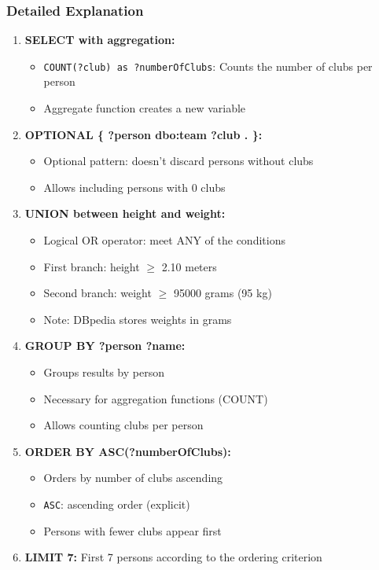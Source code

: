\documentclass[12pt,a4paper]{article}
\begin{document}
\subsubsection{Detailed Explanation}

\begin{enumerate}
    \item \textbf{SELECT with aggregation:}
    \begin{itemize}
        \item \texttt{COUNT(?club) as ?numberOfClubs}: Counts the number of clubs per person
        \item Aggregate function creates a new variable
    \end{itemize}
    
    \item \textbf{OPTIONAL \{ ?person dbo:team ?club . \}:}
    \begin{itemize}
        \item Optional pattern: doesn't discard persons without clubs
        \item Allows including persons with 0 clubs
    \end{itemize}
    
    \item \textbf{UNION between height and weight:}
    \begin{itemize}
        \item Logical OR operator: meet ANY of the conditions
        \item First branch: height $\geq$ 2.10 meters
        \item Second branch: weight $\geq$ 95000 grams (95 kg)
        \item Note: DBpedia stores weights in grams
    \end{itemize}
    
    \item \textbf{GROUP BY ?person ?name:}
    \begin{itemize}
        \item Groups results by person
        \item Necessary for aggregation functions (COUNT)
        \item Allows counting clubs per person
    \end{itemize}
    
    \item \textbf{ORDER BY ASC(?numberOfClubs):}
    \begin{itemize}
        \item Orders by number of clubs ascending
        \item \texttt{ASC}: ascending order (explicit)
        \item Persons with fewer clubs appear first
    \end{itemize}
    
    \item \textbf{LIMIT 7:} First 7 persons according to the ordering criterion
\end{enumerate}
\end{document}
